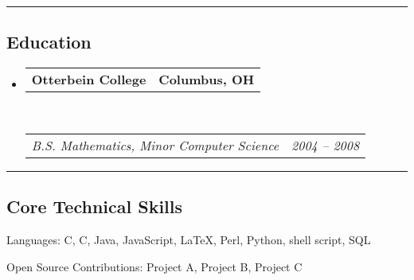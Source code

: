 \documentclass[10pt,letterpaper]{article}
\makeatletter
\newenvironment{indentsection}[1]%
{\begin{list}{}%
	{\setlength{\leftmargin}{#1}}%
	\item[]%
}
{\end{list}}
\newcommand{\headerrow}[2]
{\begin{tabular*}{\linewidth}{l@{\extracolsep{\fill}}r}
	#1 &
	#2 \\
\end{tabular*}}
\newcommand{\CPP}
{C\nolinebreak[4]\hspace{-.05em}\raisebox{.22ex}{\footnotesize\bf ++}}
\makeatother
\begin{document}
\hrule
\vspace{-0.4em}
\subsection*{Education}

\begin{itemize}
	\parskip=0.1em

	\item
	\headerrow
		{\textbf{Otterbein College}}
		{\textbf{Columbus, OH}}
	\\
	\headerrow
		{\emph{B.S. Mathematics, Minor Computer Science}}
		{\emph{2004 -- 2008}}

\end{itemize}


\hrule
\vspace{-0.4em}
\subsection*{Core Technical Skills}

\begin{indentsection}{\parindent}
\begin{description*}
	\item[Languages:]
	C, \CPP, Java, JavaScript, \LaTeX, Perl, Python, shell script, SQL
	\item[Open Source Contributions:]
	Project A, Project B, Project C
\end{description*}
\end{indentsection}
\end{document}
